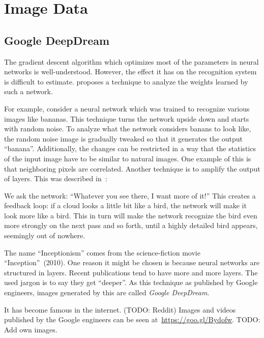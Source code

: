 
\section{Image Data}%
\label{sec:images}%

\subsection{Google DeepDream}%
\label{subsec:google-deepdream}%
The gradient descent algorithm which optimizes most of the parameters in neural
networks is well-understood. However, the effect it has on the recognition
system is difficult to estimate. \cite{inceptionism2015} proposes a technique
to analyze the weights learned by such a network.

For example, consider a neural network which was trained to recognize various
images like bananas. This technique turns the network upside down and starts
with random noise. To analyze what the network considers banans to look like,
the random noise image is gradually tweaked so that it generates the output
\enquote{banana}. Additionally, the changes can be restricted in a way that the
statistics of the input image have to be similar to natural images. One example
of this is that neighboring pixels are correlated.
\goodbreak
Another technique is to amplify the output of layers. This was described
in~\cite{inceptionism2015}:\nobreak%
\begin{displayquote}
We ask the network: \enquote{Whatever you see there, I want more of it!} This
creates a feedback loop: if a cloud looks a little bit like a bird, the network
will make it look more like a bird. This in turn will make the network
recognize the bird even more strongly on the next pass and so forth, until a
highly detailed bird appears, seemingly out of nowhere.
\end{displayquote}

The name \enquote{Inceptionism} comes from the science-fiction movie
\enquote{Inception}~(2010). One reason it might be chosen is because neural
networks are structured in layers. Recent publications tend to have more and
more layers. The used jargon is to say they get \enquote{deeper}. As this
technique as published by Google engineers, images generated by this are called
\textit{Google DeepDream}.

It has become famous in the internet. (TODO: Reddit)
Images and videos published by the Google engineers can be seen
at~\href{https://goo.gl/Bydofw}{https://goo.gl/Bydofw}. TODO: Add own images.


